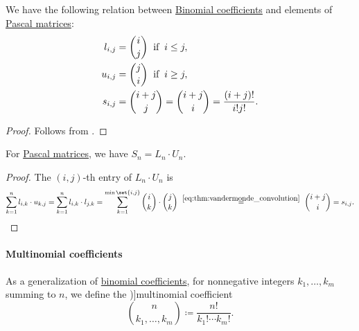 \begin{proposition}\label{thm:pascal_matrix_binomial}
  We have the following relation between \hyperref[def:binomial_coefficient]{Binomial coefficients} and elements of \hyperref[def:pascal_matrix]{Pascal matrices}:
  \begin{align*}
    l_{i,j} &= \binom i j \thickspace\T{if}\thickspace i \leq j, \\
    u_{i,j} &= \binom j i \thickspace\T{if}\thickspace i \geq j, \\
    s_{i,j} &= \binom {i + j} j = \binom {i + j} i = \frac {(i + j)!} {i! j!}. \\
  \end{align*}
\end{proposition}
\begin{proof}
  Follows from .
\end{proof}

\begin{proposition}\label{thm:pascal_matrix_product}
  For \hyperref[def:pascal_matrix]{Pascal matrices}, we have \( S_n = L_n \cdot U_n \).
\end{proposition}
\begin{proof}
  The \( (i, j) \)-th entry of \( L_n \cdot U_n \) is
  \begin{equation*}
    \sum_{k=1}^n l_{i,k} \cdot u_{k,j}
    =
    \sum_{k=1}^n l_{i,k} \cdot l_{j,k}
    =
    \sum_{k=1}^{\min\set{ i, j }} \binom i k \cdot \binom j k
    \reloset {\eqref{eq:thm:vandermonde_convolution}} =
    \binom {i + j} i
    =
    s_{i,j}.
  \end{equation*}
\end{proof}

\paragraph{Multinomial coefficients}

\begin{definition}\label{def:multinomial_coefficient}
  As a generalization of \hyperref[def:binomial_coefficient]{binomial coefficients}, for nonnegative integers \( k_1, \ldots, k_m \) summing to \( n \), we define the \term[ru=мультиномный коэффициент (\cite[\S 5.3.7]{Новиков2013ДискретнаяМатематика})]{multinomial coefficient}
  \begin{equation}\label{eq:def:multinomial_coefficient}
    \binom n {k_1, \ldots, k_m} \coloneqq \frac {n!} {k_1! \cdots k_m!}.
  \end{equation}
\end{definition}

